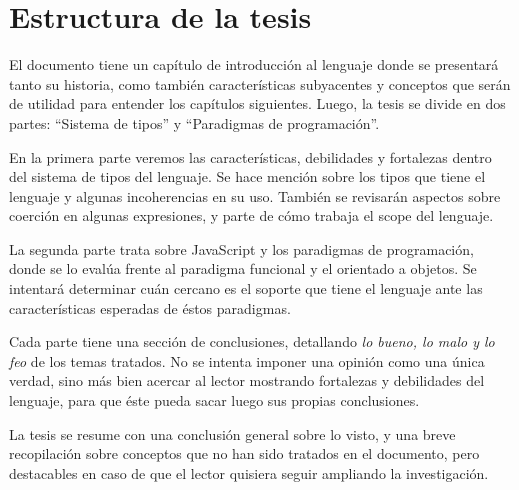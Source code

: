 
\section{Estructura de la tesis}

El documento tiene un capítulo de introducción al lenguaje donde se presentará tanto su historia, como también características subyacentes y conceptos que serán de utilidad para entender los capítulos siguientes. Luego, la tesis se divide en dos partes: "`Sistema de tipos"' y "`Paradigmas de programación"'. 

En la primera parte veremos las características, debilidades y fortalezas dentro del sistema de tipos del lenguaje. Se hace mención sobre los tipos que tiene el lenguaje y algunas incoherencias en su uso. También se revisarán aspectos sobre coerción en algunas expresiones, y parte de cómo trabaja el scope del lenguaje.

La segunda parte trata sobre JavaScript y los paradigmas de programación, donde se lo evalúa frente al paradigma funcional y el orientado a objetos. Se intentará determinar cuán cercano es el soporte que tiene el lenguaje ante las características esperadas de éstos paradigmas.

Cada parte tiene una sección de conclusiones, detallando \textit{lo bueno, lo malo y lo feo} de los temas tratados. No se intenta imponer una opinión como una única verdad, sino más bien acercar al lector mostrando fortalezas y debilidades del lenguaje, para que éste pueda sacar luego sus propias conclusiones.

La tesis se resume con una conclusión general sobre lo visto, y una breve recopilación sobre conceptos que no han sido tratados en el documento, pero destacables en caso de que el lector quisiera seguir ampliando la investigación.